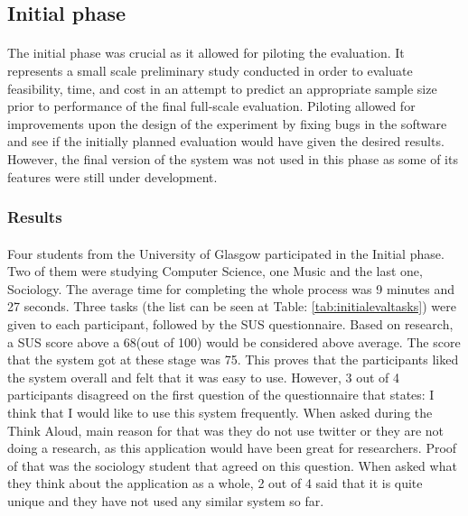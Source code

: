 \documentclass{l4proj}
\begin{document}
\subsection{Initial phase}
\paragraph{}
The initial phase was crucial as it allowed for piloting the evaluation. It represents a small scale preliminary study conducted in order to evaluate feasibility, time, and cost in an attempt to predict an appropriate sample size prior to performance of the final full-scale evaluation\cite{clinicalresearch}. Piloting allowed for improvements upon the design of the experiment by fixing bugs in the software and see if the initially planned evaluation would have given the desired results. However, the final version of the system was not used in this phase as some of its features were still under development. 
\subsubsection{Results}
\paragraph{}
Four students from the University of Glasgow participated in the Initial phase. Two of them were studying Computer Science, one Music and the last one, Sociology. The average time for completing the whole process was 9 minutes and 27 seconds. Three tasks (the list can be seen at Table: \ref{tab:initialevaltasks}) were given to each participant, followed by the SUS questionnaire. Based on research, a SUS score above a 68(out of 100) would be considered above average. The score that the system got at these stage was 75. This proves that the participants liked the system overall and felt that it was easy to use. However, 3 out of 4 participants disagreed on the first question of the questionnaire that states: I think that I would like to use this system frequently. When asked during the Think Aloud, main reason for that was they do not use twitter or they are not doing a research, as this application would have been great for researchers. Proof of that was the sociology student that agreed on this question. When asked what they think about the application as a whole, 2 out of 4 said that it is quite unique and they have not used any similar system so far.
\end{document}
